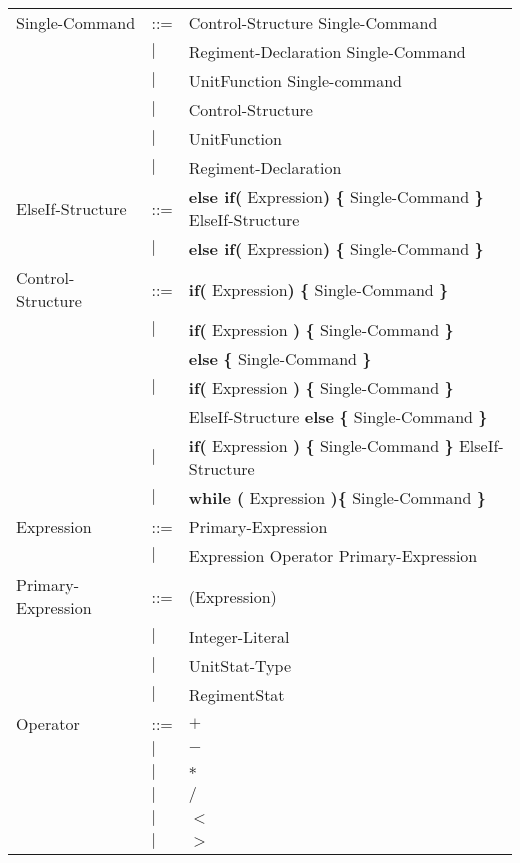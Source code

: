 \begin{center}
\begin{longtable}{l l l}
		Single-Command				&	::=	&Control-Structure Single-Command \\
									&$\mid$	&Regiment-Declaration Single-Command\\
									&$\mid$	&UnitFunction Single-command\\
									&$\mid$	&Control-Structure\\
									&$\mid$	&UnitFunction\\
									&$\mid$	&Regiment-Declaration\\
		ElseIf-Structure			&	::=	&{\bf else if( } Expression{\bf )} {\bf \{ } Single-Command {\bf \} } ElseIf-Structure\\
									&$\mid$	&{\bf else if( } Expression{\bf )} {\bf \{ } Single-Command {\bf \} } \\
		Control-Structure			&	::=	&{\bf if( } Expression{\bf )} {\bf \{ } Single-Command {\bf \} }  \\
									&$\mid$	&{\bf if(} Expression {\bf )} {\bf \{ }Single-Command {\bf \}} \\
									&		&{\bf else } {\bf \{ }Single-Command {\bf \} } \\			
									&$\mid$	&{\bf if(} Expression {\bf )} {\bf \{ }Single-Command {\bf \}} \\
									&		&ElseIf-Structure {\bf else } {\bf \{ }Single-Command {\bf \} } \\
									&$\mid$	&{\bf if(} Expression {\bf )} {\bf \{ }Single-Command {\bf \}} ElseIf-Structure \\	
									&$\mid$	&{\bf while (} Expression {\bf )}{\bf \{ } Single-Command {\bf \}} \\
		Expression					&	::=	&Primary-Expression \\
									&$\mid$	&Expression Operator Primary-Expression \\
		Primary-Expression			&	::=	&(Expression)\\
									&$\mid$	&Integer-Literal \\
									&$\mid$	&UnitStat-Type \\
									&$\mid$	&RegimentStat \\
		Operator					&	::=	&$\boldsymbol {+}$\\
									&$\mid$	&$\boldsymbol {-}$\\
									&$\mid$	&$\boldsymbol {*}$\\
									&$\mid$	&$\boldsymbol {/}$\\
									&$\mid$	&$\boldsymbol {<}$\\
									&$\mid$	&$\boldsymbol {>}$\\

\end{longtable}
\end{center}
